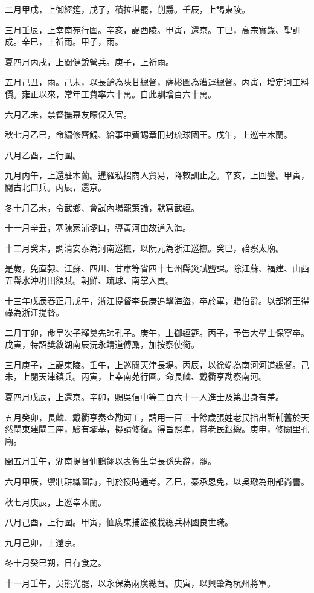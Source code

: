 \begin{pinyinscope}
二月甲戌，上御經筵，戊子，積拉堪罷，削爵。壬辰，上謁東陵。

三月壬辰，上幸南苑行圍。辛亥，謁西陵。甲寅，還京。丁巳，高宗實錄、聖訓成。辛巳，上祈雨。甲子，雨。

夏四月丙戌，上閱健銳營兵。庚子，上祈雨。

五月己丑，雨。己未，以長齡為陜甘總督，薩彬圖為漕運總督。丙寅，增定河工料價。雍正以來，常年工費率六十萬。自此馴增百六十萬。

六月乙未，禁督撫幕友矇保入官。

秋七月乙巳，命編修齊鯤、給事中費錫章冊封琉球國王。戊午，上巡幸木蘭。

八月乙酉，上行圍。

九月丙午，上還駐木蘭。暹羅私招商人貿易，降敕訓止之。辛亥，上回鑾。甲寅，閱古北口兵。丙辰，還京。

冬十月乙未，令武鄉、會試內場罷策論，默寫武經。

十一月辛丑，塞陳家浦壩口，導黃河由故道入海。

十二月癸未，調清安泰為河南巡撫，以阮元為浙江巡撫。癸巳，祫察太廟。

是歲，免直隸、江蘇、四川、甘肅等省四十七州縣災賦鹽課。除江蘇、福建、山西五縣水沖坍田額賦。朝鮮、琉球、南掌入貢。

十三年戊辰春正月戊午，浙江提督李長庚追擊海盜，卒於軍，贈伯爵。以部將王得祿為浙江提督。

二月丁卯，命皇次子釋奠先師孔子。庚午，上御經筵。丙子，予告大學士保寧卒。戊寅，特詔獎敘湖南辰沅永靖道傅鼐，加按察使銜。

三月庚子，上謁東陵。壬午，上巡閱天津長堤。丙辰，以徐端為南河河道總督。己未，上閱天津鎮兵。丙寅，上幸南苑行圍。命長麟、戴衢亨勘察南河。

夏四月戊辰，上還京。辛卯，賜吳信中等二百六十一人進士及第出身有差。

五月癸卯，長麟、戴衢亨奏查勘河工，請用一百三十餘歲張姓老民指出靳輔舊於天然閘東建閘二座，驗有壩基，擬請修復。得旨照準，賞老民銀緞。庚申，修闕里孔廟。

閏五月壬午，湖南提督仙鶴翎以表賀生皇長孫失辭，罷。

六月甲辰，禦制耕織圖詩，刊於授時通考。乙巳，秦承恩免，以吳璥為刑部尚書。

秋七月庚辰，上巡幸木蘭。

八月己酉，上行圍。甲寅，恤廣東捕盜被戕總兵林國良世職。

九月己卯，上還京。

冬十月癸巳朔，日有食之。

十一月壬午，吳熊光罷，以永保為兩廣總督。庚寅，以興肇為杭州將軍。


\end{pinyinscope}
